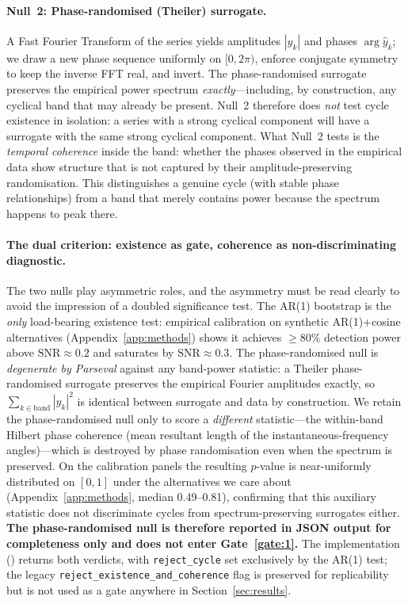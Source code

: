 \paragraph{Null~2: Phase-randomised (Theiler) surrogate.}
A Fast Fourier Transform of the series yields amplitudes
\(|\hat y_k|\) and phases \(\arg\hat y_k\); we draw a new phase
sequence uniformly on \([0,2\pi)\), enforce conjugate symmetry to
keep the inverse FFT real, and invert. The phase-randomised
surrogate preserves the empirical power spectrum
\emph{exactly}---including, by construction, any cyclical band
that may already be present. Null~2 therefore does \emph{not}
test cycle existence in isolation: a series with a strong cyclical
component will have a surrogate with the same strong cyclical
component. What Null~2 tests is the \emph{temporal coherence}
inside the band: whether the phases observed in the empirical
data show structure that is not captured by their
amplitude-preserving randomisation. This distinguishes a genuine
cycle (with stable phase relationships) from a band that merely
contains power because the spectrum happens to peak there.

\paragraph{The dual criterion: existence as gate, coherence as
non-discriminating diagnostic.}
The two nulls play asymmetric roles, and the asymmetry must be
read clearly to avoid the impression of a doubled significance
test. The AR(1) bootstrap is the \emph{only} load-bearing
existence test: empirical calibration on synthetic
AR(1)+cosine alternatives (Appendix~\ref{app:methods}) shows
it achieves \(\geq 80\%\) detection power above
\(\mathrm{SNR}\approx 0.2\) and saturates by
\(\mathrm{SNR}\approx 0.3\). The phase-randomised null is
\emph{degenerate by Parseval}
\citep{theiler_et_al1992,schreiber_schmitz2000} against any
band-power statistic: a Theiler phase-randomised surrogate
preserves the empirical Fourier amplitudes exactly, so
\(\sum_{k\in\text{band}}|\hat y_k|^2\) is identical between
surrogate and data by construction. We retain the
phase-randomised null only to score a \emph{different}
statistic---the within-band Hilbert phase coherence (mean
resultant length of the instantaneous-frequency angles)---which
is destroyed by phase randomisation even when the spectrum is
preserved. On the calibration panels the resulting
\(p\)-value is near-uniformly distributed on \([0,1]\) under
the alternatives we care about (Appendix~\ref{app:methods},
median 0.49--0.81), confirming that this auxiliary statistic
does not discriminate cycles from spectrum-preserving
surrogates either. \textbf{The phase-randomised null is
therefore reported in JSON output for completeness only and
does not enter Gate~\ref{gate:1}.} The implementation
() returns both
verdicts, with \texttt{reject\_cycle} set exclusively by the
AR(1) test; the legacy
\texttt{reject\_existence\_and\_coherence} flag is preserved
for replicability but is not used as a gate anywhere in
Section~\ref{sec:results}.

